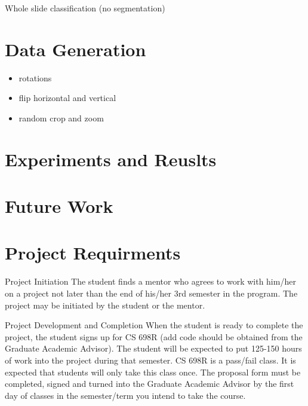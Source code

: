 \documentclass[ms,electronic,oneside,twosidetoc,letterpaper,chaptercenter,parttop]{byumsphd}
\begin{document}
Whole slide classification (no segmentation) \cite{kiran}

\chapter{Data Generation}

\begin{itemize}
  \item rotations
  \item flip horizontal and vertical
  \item random crop and zoom
\end{itemize}


\chapter{Experiments and Reuslts}

\chapter{Future Work}

\chapter{Project Requirments}

Project Initiation
The student finds a mentor who agrees to work with him/her on a project not later than the end of his/her 3rd semester in the program. The project may be initiated by the student or the mentor. 
 

Project Development and Completion
When the student is ready to complete the project, the student signs up for CS 698R (add code should be obtained from the Graduate Academic Advisor). The student will be expected to put 125-150 hours of work into the project during that semester. CS 698R is a pass/fail class. It is expected that students will only take this class once. The proposal form must be completed, signed and turned into the Graduate Academic Advisor by the first day of classes in the semester/term you intend to take the course.
\end{document}
